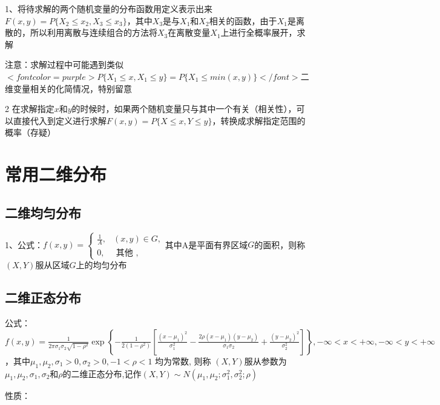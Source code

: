 1、将待求解的两个随机变量的分布函数用定义表示出来$ F(x,y)=P\{ X_2 \le x_2, X_3 \le x_3 \} $，其中$ X_3 $是与$ X_1 $和$ X_2 $相关的函数，由于$ X_1 $是离散的，所以利用离散与连续组合的方法将$ X_3 $在离散变量$ X_1 $上进行全概率展开，求解

注意：求解过程中可能遇到类似$ <font color=purple>P\{ X_1\le x,X_1\le y \} = P\{ X_1 \le min(x,y) \}</font> $二维变量相关的化简情况，特别留意



2 在求解指定$ x $和$ y $的时候时，如果两个随机变量只与其中一个有关（相关性），可以直接代入到定义进行求解$ F(x,y)=P\{ X \le x, Y \le y \} $，转换成求解指定范围的概率（存疑）

\section{常用二维分布}



\subsection{二维均匀分布}

1、公式：$ f(x, y)=\left\{\begin{array}{lc} \frac{1}{A}, & (x, y) \in G, \\ 0, & \text { 其他 }, \end{array}\right. $其中A是平面有界区域$ G $的面积，则称$ (X,Y) $服从区域$ G $上的均匀分布



\subsection{二维正态分布}

公式：$ f(x, y)=\frac{1}{2 \pi \sigma_{1} \sigma_{2} \sqrt{1-\rho^{2}}} \exp \left\{-\frac{1}{2\left(1-\rho^{2}\right)}\left[\frac{\left(x-\mu_{1}\right)^{2}}{\sigma_{1}^{2}}-\frac{2 \rho\left(x-\mu_{1}\right)\left(y-\mu_{2}\right)}{\sigma_{1} \sigma_{2}}+\frac{\left(y-\mu_{2}\right)^{2}}{\sigma_{2}^{2}}\right]\right\}, -\infty<x<+\infty,-\infty<y<+\infty $，其中$ \mu_{1}, \mu_{2}, \sigma_{1}>0, \sigma_{2}>0,-1<\rho<1 $ 均为常数, 则称 $ (X, Y)  $服从参数为$ \mu_{1}, \mu_{2}, \sigma_{1}, \sigma_{2} $和$ \rho $的二维正态分布,记作$ (X, Y) \sim N\left(\mu_{1}, \mu_{2} ; \sigma_{1}^{2}, \sigma_{2}^{2} ; \rho\right) $

性质：

